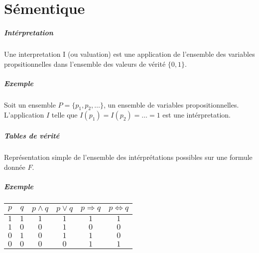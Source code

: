 \documentclass[11pt,twoside,openright,a4paper]{report}
\begin{document}
\pagestyle{fancy}

\chapter{Sémentique} %
\label{cha:s_mentique}

\paragraph{Intérpretation} %
\label{par:int_rpretation}

Une interpretation I (ou valuation) est une application de l'ensemble des variables propsitionnelles dans l'ensemble des valeurs de vérité $\{0,1\}$.


\paragraph{Exemple} %
\label{par:exemple}

Soit un ensemble $P=\{p_1, p_2, \ldots\}$, un ensemble de variables propositionnelles. L'application $I$ telle que $I(p_1)=I(p_2)=\ldots=1$ est une intérpretation.


\paragraph{Tables de vérité} %
\label{par:tables_de_v_rit_}

Représentation simple de l'ensemble des intérprétations possibles sur une formule donnée $F$.


\paragraph{Exemple} %
\label{par:exemple}

\begin{center}

	\begin{tabular}{|c|c|c|c|c|c|}
		\hline
		$p$ & $q$ & $p \land q$ & $p \lor q$ & $p \Rightarrow q$ & $p \Leftrightarrow q$ \\
		\hline
		$1$ & $1$ & $1$ & $1$ & $1$ & $1$ \\
		$1$ & $0$ & $0$ & $1$ & $0$ & $0$ \\
		$0$ & $1$ & $0$ & $1$ & $1$ & $0$ \\
		$0$ & $0$ & $0$ & $0$ & $1$ & $1$ \\
		\hline
	\end{tabular}

\end{center}
\end{document}
